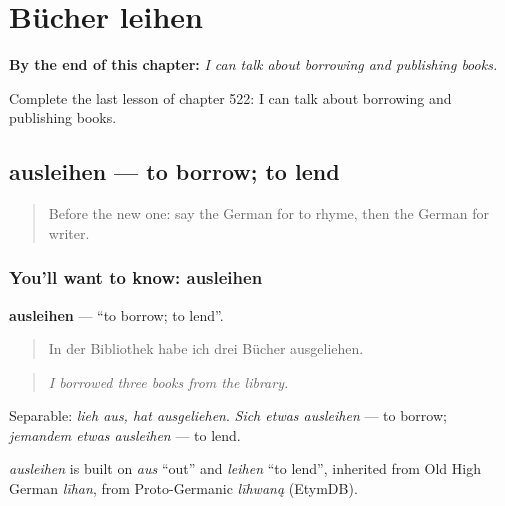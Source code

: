 
\chapter{Bücher leihen}
\label{ch:ge-bucher-leihen}

\begin{chapteropening}
\textbf{By the end of this chapter:} \emph{I can talk about borrowing and publishing books.}

Complete the last lesson of chapter 522: I can talk about borrowing and publishing books.
\end{chapteropening}

\section[ausleihen]{ausleihen — to borrow; to lend}

\label{lesson:GE-C522-ausleihen}



\begin{quote}
Before the new one: say the German for to rhyme, then the German for writer.
\end{quote}

\subsection*{You'll want to know: ausleihen}
\textbf{ausleihen} — \textquotedblleft{}to borrow; to lend\textquotedblright{}.

\begin{quote}
In der Bibliothek habe ich drei Bücher ausgeliehen.
\end{quote}

\begin{quote}
\emph{I borrowed three books from the library.}
\end{quote}

Separable: \emph{lieh aus, hat ausgeliehen}. \emph{Sich etwas ausleihen} — to borrow; \emph{jemandem etwas ausleihen} — to lend.

\begin{cousinweb}
\emph{ausleihen} is built on \emph{aus} \textquotedblleft{}out\textquotedblright{} and \emph{leihen} \textquotedblleft{}to lend\textquotedblright{}, inherited from Old High German \emph{līhan}, from Proto-Germanic \emph{līhwaną} (EtymDB).
\end{cousinweb}

